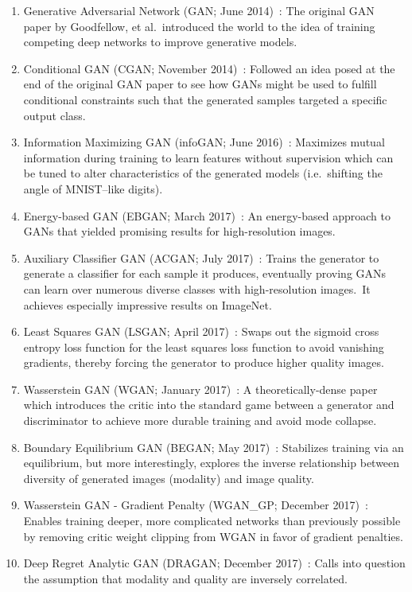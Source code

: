 \documentclass[conference]{IEEEtran}
\begin{document}
    \begin{enumerate}
        \item Generative Adversarial Network (GAN; June 2014)~\cite{goodfellow2014generative}: The original GAN paper by Goodfellow, et al.\ introduced the world to the idea of training competing deep networks to improve generative models.
        \item Conditional GAN (CGAN; November 2014)~\cite{mirza2014conditional}: Followed an idea posed at the end of the original GAN paper to see how GANs might be used to fulfill conditional constraints such that the generated samples targeted a specific output class.
        \item Information Maximizing GAN (infoGAN; June 2016)~\cite{chen2016infogan}: Maximizes mutual information during training to learn features without supervision which can be tuned to alter characteristics of the generated models (i.e.\ shifting the angle of MNIST--like digits).
        \item Energy-based GAN (EBGAN; March 2017)~\cite{zhao2017energybased}: An energy-based approach to GANs that yielded promising results for high-resolution images.
        \item Auxiliary Classifier GAN (ACGAN; July 2017)~\cite{odena2017conditional}: Trains the generator to generate a classifier for each sample it produces, eventually proving GANs can learn over numerous diverse classes with high-resolution images.\ It achieves especially impressive results on ImageNet.
        \item Least Squares GAN (LSGAN; April 2017)~\cite{mao2017squares}: Swaps out the sigmoid cross entropy loss function for the least squares loss function to avoid vanishing gradients, thereby forcing the generator to produce higher quality images.
        \item Wasserstein GAN (WGAN; January 2017)~\cite{arjovsky2017wasserstein}: A theoretically-dense paper which introduces the critic into the standard game between a generator and discriminator to achieve more durable training and avoid mode collapse.
        \item Boundary Equilibrium GAN (BEGAN; May 2017)~\cite{berthelot2017began}: Stabilizes training via an equilibrium, but more interestingly, explores the inverse relationship between diversity of generated images (modality) and image quality.
        \item Wasserstein GAN - Gradient Penalty (WGAN\_GP; December 2017)~\cite{gulrajani2017improved}: Enables training deeper, more complicated networks than previously possible by removing critic weight clipping from WGAN in favor of gradient penalties.
        \item Deep Regret Analytic GAN (DRAGAN; December 2017)~\cite{kodali2017convergence}: Calls into question the assumption that modality and quality are inversely correlated.
    \end{enumerate}
\end{document}
